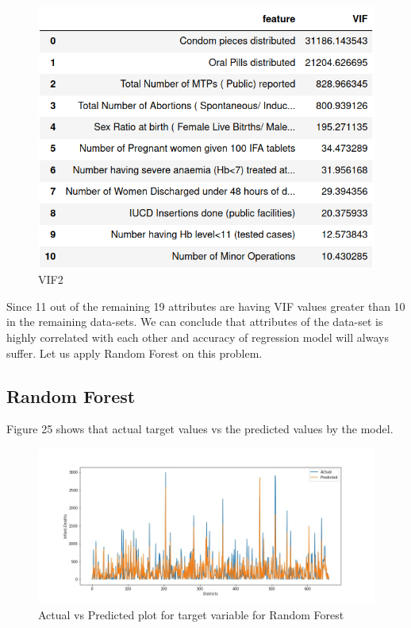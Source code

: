 \documentclass[12pt]{article}
\begin{document}
\begin{figure}[h]
\centering
\includegraphics[scale=.35]{images/vif2.png}
\caption{VIF2}
\end{figure}

Since 11 out of the remaining 19 attributes are having VIF values greater than 10 in the remaining data-sets. We can conclude that attributes of the data-set is highly correlated with each other and accuracy of regression model will always suffer. Let us apply Random Forest on this problem.\\
\subsection{Random Forest}

Figure 25 shows that actual target values vs the predicted values by the model.\\
\begin{figure}[h]
\hspace{-3.2cm}
\includegraphics[scale=.7]{images/RandomForestInfantDeathrandom.jpg}
\caption{Actual vs Predicted plot for target variable for Random Forest}
\end{figure}
\end{document}
